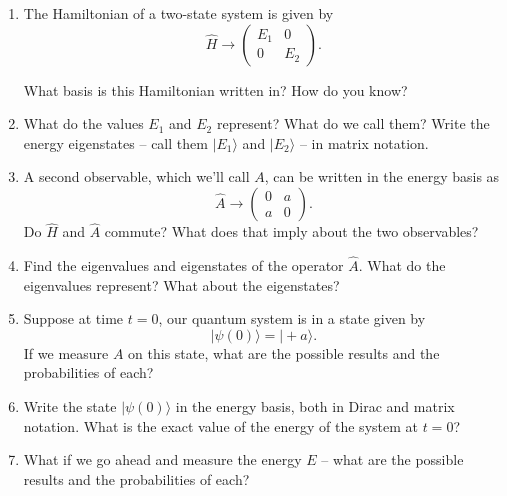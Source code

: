 \documentclass[10pt, letterpaper, twoside, openany]{article}
\newcommand{\ket}[1]{| #1 \rangle}
\begin{document}
\begin{enumerate}

\item The Hamiltonian of a two-state system is given by
\[
\hat{H} \to \begin{pmatrix}
E_1 & 0 \\ 0 & E_2
\end{pmatrix}.
\]

What basis is this Hamiltonian written in?  How do you know?  

\vspace{1in}

\item What do the values $E_1$ and $E_2$ represent?  What do we call them?  Write the energy eigenstates -- call them $\ket{E_1}$ and $\ket{E_2}$ -- in matrix notation.

\vspace{1in}

\item A second observable, which we'll call $A$, can be written in the energy basis as
\[
\hat{A} \to \begin{pmatrix}
0 & a \\ a & 0
\end{pmatrix}.
\]
Do $\hat{H}$ and $\hat{A}$ commute?  What does that imply about the two observables?

\newpage

\item Find the eigenvalues and eigenstates of the operator $\hat{A}$.  What do the eigenvalues represent?  What about the eigenstates?

\vspace{5in}

\item Suppose at time $t=0$, our quantum system is in a state given by
\[
\ket{\psi(0)} = \ket{+a}.
\]
If we measure $A$ on this state, what are the possible results and the probabilities of each?

\newpage

\item Write the state $\ket{\psi(0)}$ in the energy basis, both in Dirac and matrix notation.  What is the exact value of the energy of the system at $t=0$?

\vspace{1in}

\item What if we go ahead and measure the energy $E$ -- what are the possible results and the probabilities of each?


\end{enumerate}
\end{document}
